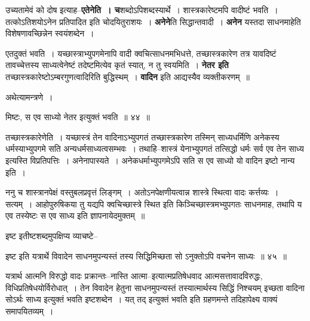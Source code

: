 \documentclass[article,12pt,a4paper]{memoir}
\begin{document}
	  \pstart उच्यतामेवं को दोष इत्याह--\textbf{एतेनेति । च}शब्दोऽपिशब्दस्यार्थे । शास्त्रकारेष्टमपि वादीष्टं भवति । तत्कोऽतिशयोऽनेन प्रतिपादित इति चोदयितुराशयः । \textbf{अनेने}ति सिद्धान्तवादी । \textbf{अनेन} यस्तदा साधनमाहेति विशेषणावच्छिन्नेन स्वयंशब्देन ।
	\pend
      

	  \pstart एतदुक्तं भवति । यच्छास्त्राभ्युपगमेनापि वादी क्वचित्साधनमभिधत्ते, तच्छास्त्रकारेण तत्र यावदिष्टं तावच्चेत्तस्य साध्यत्वेनेष्टं तदेष्टमित्येव कृतं स्यात्, न तु स्वयमिति । \textbf{नेतर इति} तच्छास्त्रकारेष्टोऽम्बरगुणत्वादिरिति बुद्धिस्थम् । \textbf{वादिन} इति आद्यस्यैव व्यक्तीकरणम् ॥
	\pend
      

	  \pstart अथेत्यामन्त्रणे ।
	\pend
	  \bigskip
	  \begingroup
	
	  \bigskip
	  \begingroup
	

	  \pstart मिष्टः, स एव साध्यो नेतर इत्युक्तं भवति ॥ ४४ ॥
	\pend
      
	  \endgroup
	 

	  \pstart तच्छास्त्रकारेणेति । यच्छास्त्रं तेन वादिनाऽभ्युपगतं तच्छास्त्रकारेण तस्मिन् साध्यधर्मिणि अनेकस्य धर्मस्याभ्युपगमे सति अन्यधर्मसाध्यत्वसम्भवः । तथाहि--शास्त्रं येनाभ्युपगतं तत्सिद्धो धर्मः सर्व एव तेन साध्य इत्यस्ति विप्रतिपत्तिः । अनेनापास्यते । अनेकधर्माभ्युपगमेऽपि सति स एव साध्यो यो वादिन इष्टो नान्य इति ।
	\pend
        

	  \pstart ननु च शास्त्रानपेक्षं वस्तुबलप्रवृत्तं लिङ्गम् । अतोऽनपेक्षणीयत्वान्न शास्त्रे स्थित्वा वादः कर्त्तव्यः । सत्यम् । आहोपुरुषिकया तु यद्यपि क्वचिच्छास्त्रे स्थित इति किञ्चिच्छास्त्रमभ्युपगतः साधनमाह, तथापि य एव तस्येष्टः स एव साध्य इति ज्ञापनायेदमुक्तम् ॥
	\pend
        

	  \pstart इष्ट इतीष्टशब्दमुपक्षिप्य व्याचष्टे--
	\pend
        
	  \bigskip
	  \begingroup
	

	  \pstart इष्ट इति यत्रार्थे विवादेन साधनमुपन्यस्तं तस्य सिद्धिमिच्छता सो ऽनुक्तोऽपि वचनेन साध्यः ॥ ४५ ॥
	\pend
      
	  \endgroup
	 

	  \pstart यत्रार्थ आत्मनि विरुद्धो वादः प्रक्रान्तः--नास्ति आत्मा--इत्यात्मप्रतिषेधवाद आत्मसत्तावादविरुद्धः, विधिप्रतिषेधयोर्विरोधात् । तेन विवादेन हेतुना साधनमुपन्यस्तं तस्यात्मार्थस्य सिद्धिं निश्चयम् इच्छता वादिना सोऽर्थः साध्य इत्युक्तं भवति इष्टशब्देन । यत् तद् इत्युक्तं भवति इति ग्रहणमन्ते तदिहापेक्ष्य वाक्यं समापयितव्यम् ।
	\pend
        
\end{document}
